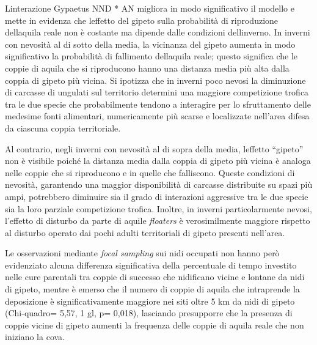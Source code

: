L{\textquotesingle}interazione Gypaetus NND * AN migliora in modo
significativo il modello e mette in evidenza che
l{\textquotesingle}effetto del gipeto sulla probabilit\`a di
riproduzione dell{\textquotesingle}aquila reale non \`e costante ma
dipende dalle condizioni dell{\textquotesingle}inverno. In inverni con
nevosit\`a al di sotto della media, la vicinanza del gipeto aumenta in
modo significativo la probabilit\`a di fallimento
dell{\textquotesingle}aquila reale; questo significa che le coppie di
aquila che si riproducono hanno una distanza media pi\`u alta dalla
coppia di gipeto pi\`u vicina. Si ipotizza che in inverni poco nevosi
la diminuzione di carcasse di ungulati sul territorio determini una
maggiore competizione trofica tra le due specie che probabilmente
tendono a interagire per lo sfruttamento delle medesime fonti
alimentari, numericamente pi\`u scarse e localizzate
nell{\textquoteright}area difesa da ciascuna coppia territoriale.

Al contrario, negli inverni con nevosit\`a al di sopra della media,
l{\textquotesingle}effetto
{\textquotedblleft}gipeto{\textquotedblright} non \`e visibile poich\'e
la distanza media dalla coppia di gipeto pi\`u vicina \`e analoga nelle
coppie che si riproducono e in quelle che falliscono. Queste condizioni
di nevosit\`a, garantendo una maggior disponibilit\`a di carcasse
distribuite su spazi pi\`u ampi, potrebbero diminuire sia il grado di
interazioni aggressive tra le due specie sia la loro parziale
competizione trofica. Inoltre, in inverni particolarmente nevosi,
l{\textquoteright}effetto di disturbo da parte di aquile
\textit{floaters }\`e verosimilmente maggiore rispetto al disturbo
operato dai pochi adulti territoriali di gipeto presenti
nell{\textquoteright}area.

Le osservazioni mediante \textit{focal sampling} sui nidi occupati non
hanno per\`o evidenziato alcuna differenza significativa della
percentuale di tempo investito nelle cure parentali tra coppie di
successo che nidificano vicine e lontane da nidi di gipeto, mentre \`e
emerso che il numero di coppie di aquila che intraprende la deposizione
\`e significativamente maggiore nei siti oltre 5 km da nidi di gipeto
(Chi-quadro= 5,57, 1 gl, p= 0,018), lasciando presupporre che la
presenza di coppie vicine di gipeto aumenti la frequenza delle coppie
di aquila reale che non iniziano la cova.  

